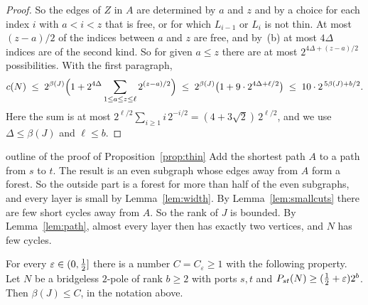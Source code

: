 \begin{proof}
 So the edges of $Z$ in $A$ are determined by $a$ and $z$ and by a choice for
each index $i$ with $a<i<z$ that is free, or for which $L_{i-1}$ or $L_i$ is not thin. At most
$(z-a)/2$ of the indices between $a$ and $z$ are free, and by~(b) at most $4\Delta$ indices are of
the second kind. So for given $a\le z$ there are at most $2^{4\Delta+(z-a)/2}$ possibilities.
With the first paragraph,
\[
  c(N)\;\le\;2^{\beta(J)}\Bigl(1+2^{4\Delta}\sum_{1\le a\le z\le\ell}2^{(z-a)/2}\Bigr)
  \;\le\;2^{\beta(J)}\bigl(1+9\cdot2^{4\Delta+\ell/2}\bigr)\;\le\;10\cdot2^{\,5\beta(J)+b/2}.
\]
Here the sum is at most $2^{\ell/2}\sum_{i\ge1}i\,2^{-i/2}=(4+3\sqrt2)\,2^{\ell/2}$, and we use
$\Delta\le\beta(J)$ and $\ell\le b$.
\end{proof}

\begin{idea}{outline of the proof of Proposition~\ref{prop:thin}}
Add the shortest path $A$ to a path from $s$ to $t$. The result is an even subgraph whose edges
away from $A$ form a forest. So the outside part is a forest for more than half of the even
subgraphs, and every layer is small by Lemma~\ref{lem:width}. By
Lemma~\ref{lem:smallcuts} there are few short cycles away from $A$. So the rank of $J$ is
bounded. By Lemma~\ref{lem:path}, almost every layer then has exactly two vertices, and $N$ has
few cycles.
\end{idea}

\begin{proposition}\label{prop:thin}
For every $\varepsilon\in(0,\tfrac12]$ there is a number $C=C_\varepsilon\ge1$ with the following
property. Let $N$ be a bridgeless $2$-pole of rank $b\ge2$ with ports $s,t$ and
$P_{st}(N)\ge(\tfrac12+\varepsilon)2^{b}$. Then $\beta(J)\le C$, in the notation above.
\end{proposition}

